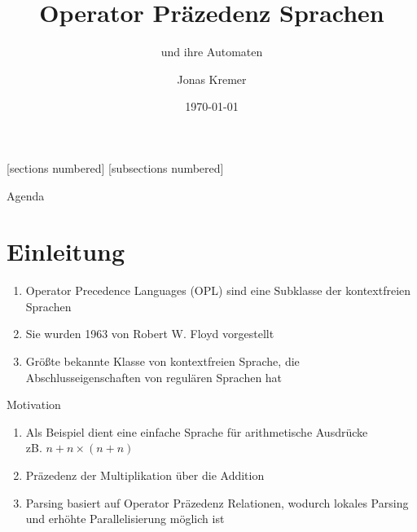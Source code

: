 \documentclass[
10pt,
pantone315, 	%
]{beamer}
\begin{document}
\date{\today}
\author{Jonas Kremer}
\title{Operator Präzedenz Sprachen}
\subtitle{und ihre Automaten}

[sections numbered]
[subsections numbered]

\AtBeginSection[]
{
	\begin{frame}[t]
\tableofcontents[currentsection, hidesubsections, hideothersubsections,
	sectionstyle=show/shaded]
	\end{frame}
}

\begin{frame}[plain]
  \maketitle
\end{frame}

\begin{frame}[t]{Agenda}
\end{frame}

\section{Einleitung}
\begin{frame}[t]{\secname}
	\begin{enumerate}[<+->]
		\item
		Operator Precedence Languages (OPL) sind eine Subklasse der kontextfreien Sprachen
		\item
		Sie wurden 1963 von Robert W. Floyd vorgestellt
		\item
		Größte bekannte Klasse von kontextfreien Sprache, die Abschlusseigenschaften von regulären Sprachen hat
		
	\end{enumerate}	
\end{frame}
\begin{frame}[t]{Motivation}
	\begin{enumerate}[<+->]
		\item 
		Als Beispiel dient eine einfache Sprache für arithmetische Ausdrücke\\
		zB. $ n + n \times (n + n)$
		\item 
		Präzedenz der Multiplikation über die Addition
		\item 
		Parsing basiert auf Operator Präzedenz Relationen, wodurch lokales Parsing und erhöhte Parallelisierung möglich ist
	\end{enumerate}	
\end{frame}
\end{document}
